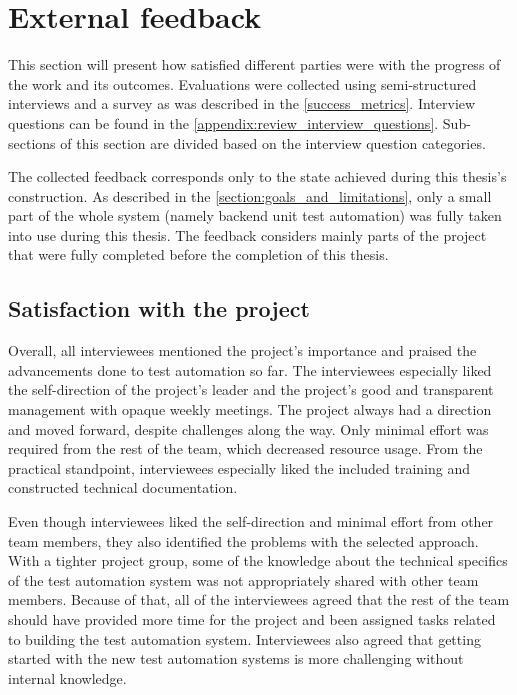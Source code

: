 \section{External feedback}
This section will present how satisfied different parties were with the progress of the work and its outcomes. Evaluations were collected using semi-structured interviews and a survey as was described in the \autoref{success_metrics}. Interview questions can be found in the \autoref{appendix:review_interview_questions}. Sub-sections of this section are divided based on the interview question categories.

The collected feedback corresponds only to the state achieved during this thesis's construction. As described in the \autoref{section:goals_and_limitations}, only a small part of the whole system (namely backend unit test automation) was fully taken into use during this thesis. The feedback considers mainly parts of the project that were fully completed before the completion of this thesis.

\subsection{Satisfaction with the project}\label{subsection:satisfaction_with_the_project}
Overall, all interviewees mentioned the project's importance and praised the advancements done to test automation so far. The interviewees especially liked the self-direction of the project's leader and the project's good and transparent management with opaque weekly meetings. The project always had a direction and moved forward, despite challenges along the way. Only minimal effort was required from the rest of the team, which decreased resource usage. From the practical standpoint, interviewees especially liked the included training and constructed technical documentation.

Even though interviewees liked the self-direction and minimal effort from other team members, they also identified the problems with the selected approach. With a tighter project group, some of the knowledge about the technical specifics of the test automation system was not appropriately shared with other team members. Because of that, all of the interviewees agreed that the rest of the team should have provided more time for the project and been assigned tasks related to building the test automation system. Interviewees also agreed that getting started with the new test automation systems is more challenging without internal knowledge.

